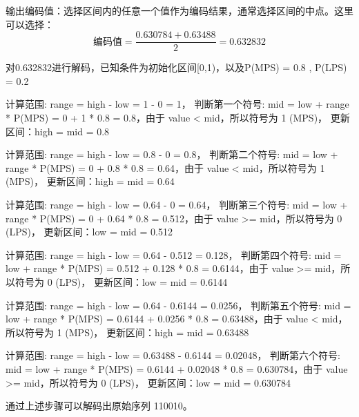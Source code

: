 \documentclass{/home/hi/Study/template/code}
\begin{document}
\begin{tcolorbox}
\begin{serialNumber}
		\item 输出编码值：选择区间内的任意一个值作为编码结果，通常选择区间的中点。这里可以选择：
		\begin{equation}
			\text{编码值} = \frac{0.630784 + 0.63488}{2} = 0.632832
		\end{equation}
	\end{serialNumber}


\end{tcolorbox}

\begin{tcolorbox}
	\small
	对0.632832进行解码，已知条件为初始化区间[0,1)，以及P(MPS) = 0.8 , P(LPS) = 0.2
	\begin{serialNumber}
		\item 计算范围: range = high - low = 1 - 0 = 1，
		判断第一个符号: mid = low + range * P(MPS) = 0 + 1 * 0.8 = 0.8，由于 value < mid，所以符号为 1 (MPS)，
		更新区间：high = mid = 0.8

		\item 计算范围: range = high - low = 0.8 - 0 = 0.8，
		判断第二个符号: mid = low + range * P(MPS) = 0 + 0.8 * 0.8 = 0.64，由于 value < mid，所以符号为 1 (MPS)，
		更新区间：high = mid = 0.64
		\item 计算范围: range = high - low = 0.64 - 0 = 0.64，
		判断第三个符号: mid = low + range * P(MPS) = 0 + 0.64 * 0.8 = 0.512，由于 value >= mid，所以符号为 0 (LPS)，
		更新区间：low = mid = 0.512

		\item 计算范围: range = high - low = 0.64 - 0.512 = 0.128，
		判断第四个符号: mid = low + range * P(MPS) = 0.512 + 0.128 * 0.8 = 0.6144，由于 value >= mid，所以符号为 0 (LPS)，
		更新区间：low = mid = 0.6144

		\item 计算范围: range = high - low = 0.64 - 0.6144 = 0.0256，
		判断第五个符号: mid = low + range * P(MPS) = 0.6144 + 0.0256 * 0.8 = 0.63488，由于 value < mid，所以符号为 1 (MPS)，
		更新区间：high = mid = 0.63488

		\item 计算范围: range = high - low = 0.63488 - 0.6144 = 0.02048，
		判断第六个符号: mid = low + range * P(MPS) = 0.6144 + 0.02048 * 0.8 = 0.630784，由于 value >= mid，所以符号为 0 (LPS)，
		更新区间：low = mid = 0.630784
	\end{serialNumber}

	通过上述步骤可以解码出原始序列 110010。
\end{tcolorbox}


\newpage
\end{document}
